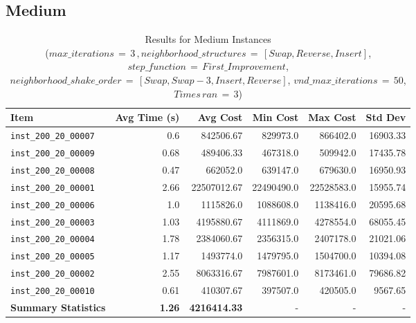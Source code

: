 \documentclass{article}
\begin{document}
\subsection*{Medium}
\begin{table}[H]
	\centering 
	   \caption{Results for Medium Instances \\($max\_iterations \,{=}\, 3\,, neighborhood\_structures \,{=}\, [Swap, Reverse, Insert]$, $step\_function \,{=}\, First\_Improvement$, $neighborhood\_shake\_order \,{=}\, [Swap, Swap-3, Insert, Reverse]$, $vnd\_max\_iterations \,{=}\, 50$, $Times\, ran \,{=}\, 3$)}
        \hspace*{-2cm}
	\begin{tabular}{lrrrrr} 
		\toprule 
		\textbf{Item} & \textbf{Avg Time (s)} & \textbf{Avg Cost} & \textbf{Min Cost} & \textbf{Max Cost} & \textbf{Std Dev} \\
		\midrule 
		\texttt{inst\_200\_20\_00007} & 0.6 & 842506.67 & 829973.0 & 866402.0 & 16903.33 \\ \texttt{inst\_200\_20\_00009} & 0.68 & 489406.33 & 467318.0 & 509942.0 & 17435.78 \\ \texttt{inst\_200\_20\_00008} & 0.47 & 662052.0 & 639147.0 & 679630.0 & 16950.93 \\ \texttt{inst\_200\_20\_00001} & 2.66 & 22507012.67 & 22490490.0 & 22528583.0 & 15955.74 \\ \texttt{inst\_200\_20\_00006} & 1.0 & 1115826.0 & 1088608.0 & 1138416.0 & 20595.68 \\ \texttt{inst\_200\_20\_00003} & 1.03 & 4195880.67 & 4111869.0 & 4278554.0 & 68055.45 \\ \texttt{inst\_200\_20\_00004} & 1.78 & 2384060.67 & 2356315.0 & 2407178.0 & 21021.06 \\ \texttt{inst\_200\_20\_00005} & 1.17 & 1493774.0 & 1479795.0 & 1504700.0 & 10394.08 \\ \texttt{inst\_200\_20\_00002} & 2.55 & 8063316.67 & 7987601.0 & 8173461.0 & 79686.82 \\ \texttt{inst\_200\_20\_00010} & 0.61 & 410307.67 & 397507.0 & 420505.0 & 9567.65 \\ \midrule \textbf{Summary Statistics} & \textbf{1.26} & \textbf{4216414.33} & - & - & - \\
		\bottomrule
	\end{tabular}
	\label{tab:performance_metrics_medium_gvns}
\end{table}
\end{document}
